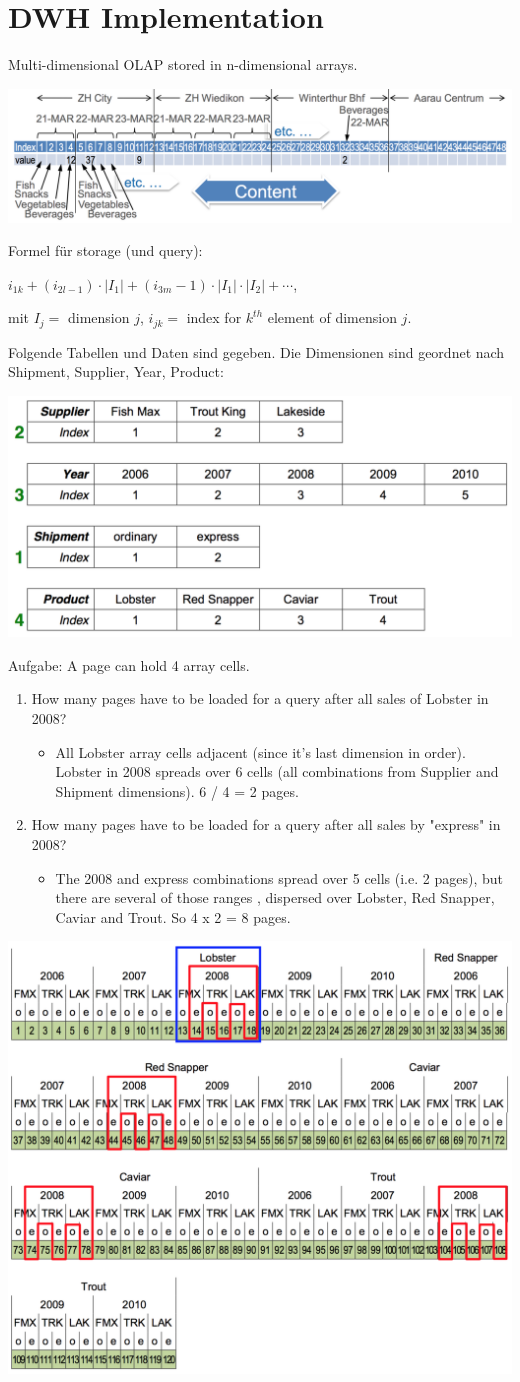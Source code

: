 
\section{DWH Implementation}

\begin{breakbox}
\newline Multi-dimensional OLAP stored in n-dimensional arrays.
\begin{center}
\includegraphics[width=.15\textwidth]{slides_images/molap.png}
\end{center}
Formel für storage (und query):
\begin{center}
$i_{1k} + (i_{2l-1}) \cdot |I_1| + (i_{3m}-1) \cdot |I_1| \cdot |I_2| + \cdots$,
\end{center}
mit $I_j =$ dimension $j$, $i_{jk} =$ index for $k^{th}$ element of dimension $j$.
\end{breakbox}

\begin{breakbox}
\newline Folgende Tabellen und Daten sind gegeben. Die Dimensionen sind geordnet nach Shipment, Supplier, Year, Product:
\begin{center}
\includegraphics[width=.15\textwidth]{slides_images/molap_example.png}
\end{center}
Aufgabe: A page can hold 4 array cells.
\begin{enumerate}[label=(\alph*)]
	\item How many pages have to be loaded for a query after all sales of Lobster in 2008?
		\begin{itemize}
			\item[] All Lobster array cells adjacent (since it's last dimension in order). Lobster in 2008 spreads over 6 cells (all combinations from Supplier and Shipment dimensions). 6 / 4 = 2 pages.
		\end{itemize}
	\item How many pages have to be loaded for a query after all sales by "express" in 2008?
		\begin{itemize}
			\item[] The 2008 and express combinations spread over 5 cells (i.e. 2 pages), but there are several of those ranges , dispersed over Lobster, Red Snapper, Caviar and Trout. So 4 x 2 = 8 pages.
		\end{itemize}
\end{enumerate}
\begin{center}
\includegraphics[width=.15\textwidth]{slides_images/molap_solution.png}
\end{center}
\end{breakbox}

